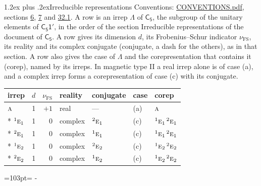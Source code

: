\documentclass[10pt,a4paper]{article}
\makeatletter
\renewcommand\section{\@startsection{section}{1}{\z@}{-3ex plus -1ex minus -.2ex}%
  {1.2ex plus .2ex}{\normalfont\large\sffamily\bfseries\color{parttitle}}}
\newcommand{\needspace}[1]{\par\penalty-100\begingroup\dimen0=#1\relax\dimen2=\pagegoal
  \advance\dimen2-\pagetotal\ifdim\dimen0>\dimen2\relax\ifdim\dimen2>0pt\vfil\break\fi\fi
  \endgroup}
\numberwithin{equation}{section}
\newcommand{\grp}[1]{\mathsf{#1}}
\newcommand{\irr}[1]{\text{\normalfont\scshape #1}}
\newcommand{\conjpair}[1]{{}^{#1}}
\newcommand{\fsind}{\nu_{\mathrm{FS}}}
\makeatother
\begin{document}
\section{Irreducible representations}\label{s:irreps}
Conventions: \href{../../CONVENTIONS.pdf}{CONVENTIONS.pdf}, sections \href{../../../rotation/CONVENTIONS.pdf\#conv.6}{6}, \href{../../../rotation/CONVENTIONS.pdf\#conv.7}{7} and \href{../../CONVENTIONS.pdf\#conv.32.1}{32.1}.
\leavevmode\label{n:irrep.Delta}A row is an irrep $\Lambda$ of $\grp{C_{5}}$, the subgroup of the unitary elements of $\grp{C_{5}1'}$, in the order of the section Irreducible representations of the document of \href{../../../rotation/data/pdf/C5.pdf}{$\grp{C_{5}}$}. \label{n:index.dimension}\label{n:index.frobenius}\label{n:head.irrep}\label{n:head.reality}\label{n:head.conjugate}A row gives its dimension $d$, its Frobenius--Schur indicator $\fsind$, its reality and its complex conjugate (conjugate, a dash for the others), as in that section. \label{n:head.case.corep}\label{n:head.corep}A row also gives the case of $\Lambda$ and the corepresentation that contains it (corep), named by its irreps. In magnetic type II a real irrep alone is of case (a), and a complex irrep forms a corepresentation of case (c) with its conjugate.
\setlength{\emergencystretch}{2em}\par\setlength{\emergencystretch}{0pt}
{\small\renewcommand{\arraystretch}{1.25}\setlength{\tabcolsep}{4pt}\begin{longtable}{@{}lrrllll@{}}\toprule
irrep & $d$ & $\fsind$ & reality & conjugate & case & corep\\\midrule\endhead
\bottomrule\endfoot\endlastfoot
$\irr{a}$ & 1 & $+1$ & real & --- & (a) & $\irr{a}$\\*
$\conjpair{1}\irr{e}_{1}$ & 1 & $0$ & complex & $\conjpair{2}\irr{e}_{1}$ & (c) & $\conjpair{1}\irr{e}_{1}\,\conjpair{2}\irr{e}_{1}$\\*
$\conjpair{2}\irr{e}_{1}$ & 1 & $0$ & complex & $\conjpair{1}\irr{e}_{1}$ & (c) & $\conjpair{1}\irr{e}_{1}\,\conjpair{2}\irr{e}_{1}$\\*
$\conjpair{1}\irr{e}_{2}$ & 1 & $0$ & complex & $\conjpair{2}\irr{e}_{2}$ & (c) & $\conjpair{1}\irr{e}_{2}\,\conjpair{2}\irr{e}_{2}$\\*
$\conjpair{2}\irr{e}_{2}$ & 1 & $0$ & complex & $\conjpair{1}\irr{e}_{2}$ & (c) & $\conjpair{1}\irr{e}_{2}\,\conjpair{2}\irr{e}_{2}$\\
\bottomrule\end{longtable}}
\needspace{103pt}
\end{document}
